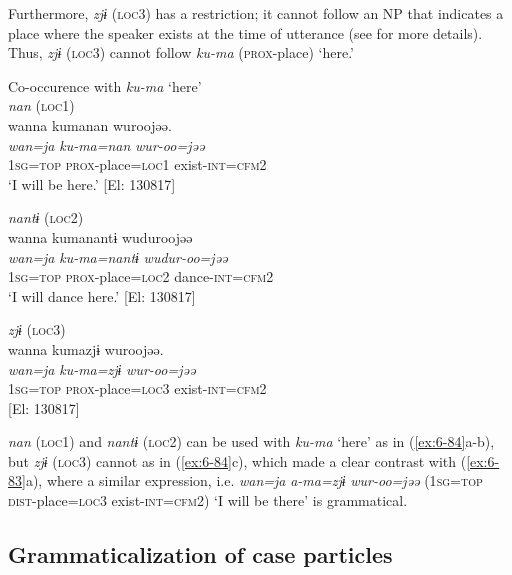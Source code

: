   Furthermore, \textit{zjɨ} (\textsc{loc3}) has a restriction; it cannot follow an NP that indicates a place where the speaker exists at the time of utterance (see  for more details). Thus, \textit{zjɨ} (\textsc{loc3}) cannot follow \textit{ku-ma} (\textsc{prox}-place) ‘here.’

\ea\label{ex:6-84}
 Co-occurence with \textit{ku-ma} ‘here’\\

 \ea \textit{nan} (\textsc{loc1})\\
{\TM}
\glll  wanna  kumanan  wuroojəə.\\
\textit{wan=ja}  \textit{ku-ma=nan}  \textit{wur-oo=jəə}\\
1\textsc{sg}=\textsc{top}  \textsc{prox}-place=\textsc{loc1}  exist-\textsc{int}=\textsc{cfm}2\\
\glt ‘I will be here.’ [El: 130817]

\ex \textit{nantɨ} (\textsc{loc2})\\
{\TM}
\glll  wanna  kumanantɨ  wuduroojəə\\
\textit{wan=ja}  \textit{ku-ma=nantɨ}  \textit{wudur-oo=jəə}\\
1\textsc{sg}=\textsc{top}  \textsc{prox}-place=\textsc{loc2}  dance-\textsc{int}=\textsc{cfm}2\\
\glt ‘I will dance here.’ [El: 130817]

\ex \textit{zjɨ} (\textsc{loc3})\\
{\TM}
\glll  *wanna  kumazjɨ  wuroojəə.\\
\textit{wan=ja}  \textit{ku-ma=zjɨ}  \textit{wur-oo=jəə}\\
1\textsc{sg}=\textsc{top}  \textsc{prox}-place=\textsc{loc3}  exist-\textsc{int}=\textsc{cfm}2 \\
{}[El: 130817]
\z
\z

\textit{nan} (\textsc{loc1}) and \textit{nantɨ} (\textsc{loc2}) can be used with \textit{ku-ma} ‘here’ as in (\ref{ex:6-84}a-b), but \textit{zjɨ} (\textsc{loc3}) cannot as in (\ref{ex:6-84}c), which made a clear contrast with (\ref{ex:6-83}a), where a similar expression, i.e. \textit{wan=ja} \textit{a-ma=zjɨ} \textit{wur-oo=jəə} (1\textsc{sg}=\textsc{top} \textsc{dist}-place=\textsc{loc3} exist-\textsc{int}=\textsc{cfm}2) ‘I will be there’ is grammatical.

\subsection{Grammaticalization of case particles}

